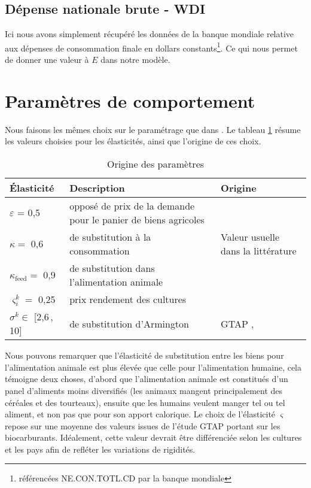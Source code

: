 \subsection{Dépense nationale brute - WDI}

Ici nous avons simplement récupéré les données de la banque mondiale relative aux dépenses de consommation finale en dollars constants\footnote{référencées NE.CON.TOTL.CD par la banque mondiale}. Ce qui nous permet de donner une valeur à $E$ dans notre modèle.


\section{Paramètres de comportement}
Nous faisons les mêmes choix sur le paramétrage que dans \cite{Gouel2025}. Le tableau \ref{tab:ela} résume les valeurs choisies pour les élasticités, ainsi que l'origine de ces choix.

\begin{table}[h]
    \centering
    \begin{tabularx}{\textwidth}{l >{\raggedright\arraybackslash}X >{\raggedright\arraybackslash}X}
        \textbf{Élasticité}        & \textbf{Description}                                           & \textbf{Origine}                                   \\ \hline
        $\varepsilon$ = 0,5        & opposé de prix de la demande pour le panier de biens agricoles & \cite{Comin2021}                                   \\
        $\kappa =$ 0,6             & de substitution à la consommation                              & Valeur usuelle dans la littérature \cite{Rude2000} \\
        $\kappa_\text{feed} =$ 0,9 & de substitution dans l'alimentation animale                    & \cite{Rude2000}                                    \\
        $\varsigma_i^k =$ 0,25     & prix rendement des cultures                                    & \cite{Keeney2009}                                  \\
        $\sigma^k \in$ [2,6\,, 10] & de substitution d'Armington                                    & GTAP  \cite{Aguiar2022}, \cite{Costinot2016}       \\
        \hline
    \end{tabularx}
    \caption{Origine des paramètres}
    \label{tab:ela}
\end{table}

Nous pouvons remarquer que l'élasticité de substitution entre les biens pour l'alimentation animale est plus élevée que celle pour l'alimentation humaine, cela témoigne deux choses, d'abord que l'alimentation animale est constitués d'un panel d'aliments moins diversifiés (les animaux mangent principalement des céréales et des tourteaux), ensuite que les humains veulent manger tel ou tel aliment, et non pas que pour son apport calorique.
Le choix de l'élasticité $\varsigma$ repose sur une moyenne des valeurs issues de l'étude GTAP \cite{Miller2009} portant sur les biocarburants. Idéalement, cette valeur devrait être différenciée selon les cultures et les pays afin de refléter les variations de rigidités.

